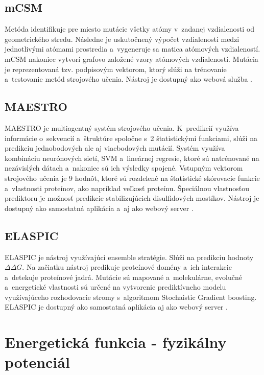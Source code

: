 \subsection{mCSM}

Metóda identifikuje pre miesto mutácie všetky atómy v~zadanej vzdialenosti od geometrického stredu. Následne je uskutočnený výpočet vzdialenosti medzi jednotlivými atómami prostredia a~vygeneruje sa matica atómových vzdialeností. mCSM nakoniec vytvorí grafovo založené vzory atómových vzdialeností. Mutácia je reprezentovaná tzv. podpisovým vektorom, ktorý slúži na trénovanie a~testovanie metód strojového učenia. Nástroj je dostupný ako webová služba \cite{mcsm}.

\subsection{MAESTRO}

MAESTRO je multiagentný systém strojového učenia. K~predikcií využíva informácie o~sekvencií a~štruktúre spoločne s~2 štatistickými funkciami, slúži na predikciu jednobodových ale aj viacbodových mutácií. Systém využíva kombináciu neurónových sietí, SVM a~lineárnej regresie, ktoré sú natrénované na nezávislých dátach a~nakoniec sú ich výsledky spojené. Vstupným vektorom strojového učenia je 9 hodnôt, ktoré sú rozdelené na štatistické skórovacie funkcie a~vlastnosti proteínov, ako napríklad veľkosť proteínu. Špeciálnou vlastnosťou prediktoru je možnosť predikcie stabilizujúcich disulfidových mostíkov. Nástroj je dostupný ako samostatná aplikácia a~aj ako webový server \cite{maestro}.

\subsection{ELASPIC}

ELASPIC je nástroj využívajúci ensemble stratégie. Slúži na predikciu hodnoty $\Delta\Delta G$. Na začiatku nástroj predikuje proteínové domény a~ich interakcie a~detekuje proteínové jadrá. Mutácie sú mapované a~molekulárne, evolučné a~energetické vlastnosti sú určené na vytvorenie prediktívneho modelu využívajúceho rozhodovacie stromy s~algoritmom Stochaistic Gradient boosting. ELASPIC je dostupný ako samostatná aplikácia aj ako webový server \cite{elaspic}.

\section{Energetická funkcia - fyzikálny potenciál}


